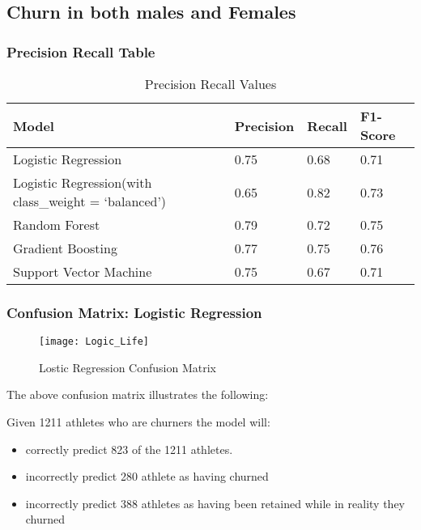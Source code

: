 \documentclass[
10pt, %
a4paper, %
oneside, %
headinclude,footinclude, %
BCOR5mm, %
]{scrartcl}
\begin{document}
\subsection{Churn in both males and Females}
\subsubsection{Precision Recall Table}

\begin{table}[H]
\centering
\caption{Precision Recall Values}
\label{my-label}
\begin{tabular}{@{}llll@{}}
\toprule
Model               & Precision & Recall & F1-Score \\ \midrule
Logistic Regression & 0.75      & 0.68   & 0.71     \\
Logistic Regression(with class\_weight = `balanced') & 0.65      & 0.82   & 0.73     \\
Random Forest       & 0.79      & 0.72   & 0.75     \\
Gradient Boosting   & 0.77      & 0.75   & 0.76     \\ 
Support Vector Machine   & 0.75      & 0.67   & 0.71     \\  \bottomrule
\end{tabular}
\end{table}

\subsubsection{Confusion Matrix: Logistic Regression}

\begin{figure}[H]
\centering 
\texttt{[image: Logic\_Life]} 
\caption[Lostic Regression Confusion Matrix]{Lostic Regression Confusion Matrix} %
\label{fig:gallery} 
\end{figure}

The above confusion matrix illustrates the following: 

Given 1211 athletes who are churners the model will:

\begin{itemize}
\item correctly predict 823 of the 1211 athletes. 
\item incorrectly predict 280 athlete as having churned 
\item incorrectly predict 388 athletes as having been retained while in reality they churned
\end{itemize}
\end{document}
